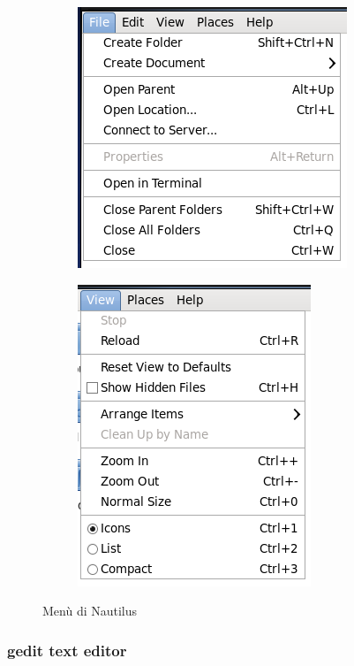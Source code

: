 \begin{figure}[!ht]
 \centering
 \begin{subfigure}{0.4\textwidth}
  \includegraphics[scale=0.5]{Immagini/Nautilus_File2.png}
  \label{fig:Nautilus_File}
 \end{subfigure}
 \begin{subfigure}{0.4\textwidth}
  \includegraphics[scale=0.5]{Immagini/Nautilus_View2.png}
  \label{fig:Nautilus_View}
 \end{subfigure}
 \caption{Menù di Nautilus}
\end{figure}




\subsubsection{gedit text editor}

